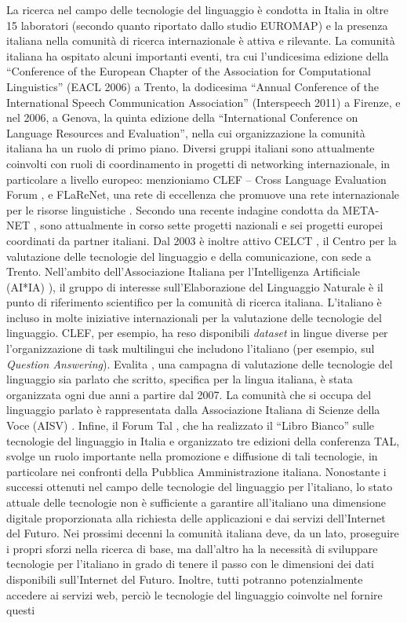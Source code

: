 \begin{multicols}{2}
La ricerca nel campo delle tecnologie del linguaggio \`{e} condotta in Italia in oltre 15 laboratori (secondo quanto riportato dallo studio EUROMAP) e la presenza italiana nella comunit\`{a} di ricerca internazionale \`{e} attiva e rilevante. La comunit\`{a} italiana ha ospitato alcuni importanti eventi, tra cui l'undicesima edizione della “Conference of the European Chapter of the Association for Computational Linguistics'' (EACL 2006) a Trento, la dodicesima “Annual Conference of the International Speech Communication Association'' (Interspeech 2011) a Firenze, e nel 2006, a Genova, la quinta edizione della “International Conference on Language Resources and Evaluation'', nella cui organizzazione la comunit\`{a} italiana ha un ruolo di primo piano. Diversi gruppi italiani sono attualmente coinvolti con ruoli di coordinamento in progetti di networking internazionale, in particolare a livello europeo: menzioniamo CLEF -- Cross Language Evaluation Forum \cite{clef}, e FLaReNet, una rete di eccellenza che promuove una rete internazionale per le risorse linguistiche \cite{flarenet}. Secondo una recente indagine condotta da META-NET \cite{soria}, sono attualmente in corso sette progetti nazionali e sei progetti europei coordinati da partner italiani. Dal 2003 \`{e} inoltre attivo CELCT \cite{celct}, il Centro per la valutazione delle tecnologie del linguaggio e della comunicazione, con sede a Trento. Nell'ambito dell'Associazione Italiana per l'Intelligenza Artificiale (AI*IA) \cite{aixia}), il gruppo di interesse sull'Elaborazione del Linguaggio Naturale \`{e} il punto di riferimento scientifico per la comunit\`{a} di ricerca italiana. L'italiano \`{e} incluso in molte iniziative internazionali per la valutazione delle tecnologie del linguaggio. CLEF, per esempio, ha reso disponibili \emph{dataset} in lingue diverse per l'organizzazione di task multilingui che includono l'italiano (per esempio, sul \emph{Question Answering}). Evalita \cite{evalita}, una campagna di valutazione delle tecnologie del linguaggio sia parlato che scritto, specifica per la lingua italiana, \`{e} stata organizzata ogni due anni a partire dal 2007. La comunit\`{a} che si occupa del linguaggio parlato \`{e} rappresentata dalla Associazione Italiana di Scienze della Voce (AISV) \cite{aisv}. Infine, il Forum Tal \cite{forumtal}, che ha realizzato il “Libro Bianco” sulle tecnologie del linguaggio in Italia e organizzato tre edizioni della conferenza TAL, svolge un ruolo importante nella promozione e diffusione di tali tecnologie, in particolare nei confronti della Pubblica Amministrazione italiana. Nonostante i successi ottenuti nel campo delle tecnologie del linguaggio per l'italiano, lo stato attuale delle tecnologie non \`{e} sufficiente a garantire all'italiano una dimensione digitale  proporzionata alla richiesta delle applicazioni e dai servizi dell'Internet del Futuro. Nei prossimi decenni la comunit\`{a} italiana deve, da un lato, proseguire i propri sforzi nella ricerca di base, ma dall'altro ha la necessit\`{a} di sviluppare tecnologie per l'italiano in grado di tenere il passo con le dimensioni dei dati disponibili sull'Internet del Futuro. Inoltre, tutti potranno potenzialmente accedere ai servizi web, perci\`{o} le tecnologie del linguaggio coinvolte nel fornire questi 
\end{multicols}
